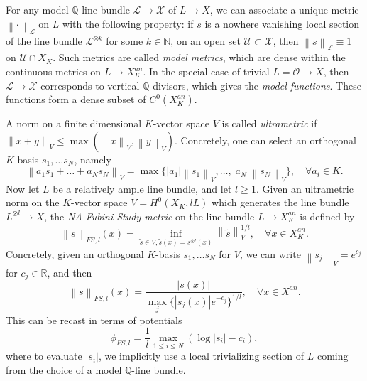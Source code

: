\documentclass[a4paper]{article}
\theoremstyle{definition}
\newcommand{\R}{\mathbb{R}}
\newcommand{\N}{\mathbb{N}}
\newcommand{\Q}{\mathbb{Q}}
\newcommand{\norm}[1]{\left\lVert#1\right\rVert}
\begin{document}
	
	
	
	
For any model $\Q$-line bundle $\mathcal{L}\to \mathcal{X}$ of $L\to X$, we can associate a unique metric $\norm{\cdot}_{ \mathcal{L} }$ on $L$ with the following property: if $s$ is a nowhere vanishing local section of the line bundle $\mathcal{L}^{\otimes k}$ for some $k\in \N$, on an open set $\mathcal{U}\subset \mathcal{X}$, then $\norm{s}_{ \mathcal{L} } \equiv 1$ on $\mathcal{U}\cap X_K$.  Such metrics are called \emph{model metrics}, which are dense within the continuous metrics on $L\to X_K^{an}$. In the special case of trivial $L=\mathcal{O}\to X$, then $\mathcal{L}\to \mathcal{X}$ corresponds to vertical $\Q$-divisors, which 
gives the \emph{model functions}. These functions form a dense subset of  $C^0(X_K^{an})$. 
	
	
	
	
	
	
	
	A norm on a finite dimensional $K$-vector space $V$ is called \emph{ultrametric} if $\norm{x+y}_V\leq \max(\norm{x}_V, \norm{y}_V)$. Concretely, one can select an orthogonal $K$-basis $s_1,\ldots s_N$, namely
		\[
	\norm{ a_1s_1+ \ldots+ a_N s_N}_V=\max\{ |a_1|\norm{s_1}_V,\ldots ,|a_N|  \norm{s_N}_V  \}, \quad \forall a_i\in K.
	\]
	Now let $L$ be a relatively ample line bundle, and let $l\geq 1$. Given an ultrametric norm on the $K$-vector space $V=H^0(X_K,lL)$ which generates the line bundle $L^{\otimes l}\to X$, the \emph{NA Fubini-Study metric} on the line bundle $L\to X_K^{an}$ is defined by
	\[
	\norm{s}_{FS,l}(x)=  \inf_{ \tilde{s}\in V, \tilde{s}(x)=s^{\otimes l}(x)} \norm{ \tilde{s}}_V^{1/l}, \quad \forall x\in X_K^{an}.
	\]
	Concretely, given an orthogonal $K$-basis $s_1, \ldots s_N$ for $V$, we can write
  $\norm{s_j}_V= e^{c_j} $ for $c_j\in \R$, and  then
	\begin{equation*}%
		\norm{s}_{FS ,l}(x)= \frac{ |s(x)|}{ \max_j \{  |s_j(x)|e^{-c_j}  \}^{1/l}   }, \quad \forall x\in X^{an}.
	\end{equation*}
	This can be recast in terms of potentials
	\begin{equation}\label{NAFubiniStudy}
		\phi_{FS,l}= \frac{1}{l} \max_{1\leq i\leq N}(\log |s_i| -c_i),
	\end{equation}
	where to evaluate $|s_i|$, we implicitly use a local trivializing section of $L$ coming from the choice of a model $\Q$-line bundle. 
	
	
	
	
	
\end{document}

